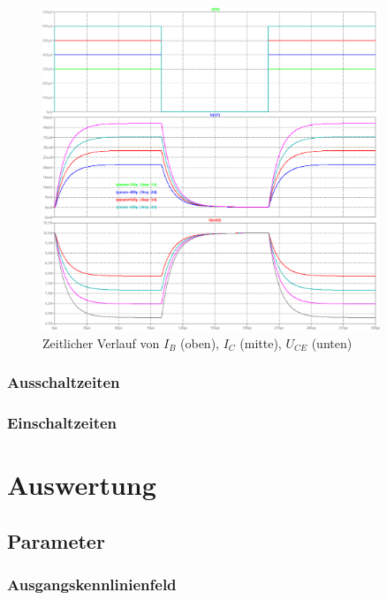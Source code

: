 \documentclass[
	a4paper, %
	12pt, %
]{CSUniSchoolLabReport}
\begin{document}
\begin{figure}[H]
	\centering
	\includegraphics[width=0.9\textwidth]{Figures/LTSpiceTime300u.png}
	\caption{Zeitlicher Verlauf von $I_B$ (oben), $I_C$ (mitte), $U_{CE}$ (unten)}
	\label{fig:300uVerlauf3}
\end{figure}


\subsubsection{Ausschaltzeiten}

\subsubsection{Einschaltzeiten}

\section{Auswertung}
\subsection{Parameter}
\subsubsection{Ausgangskennlinienfeld}
\end{document}
